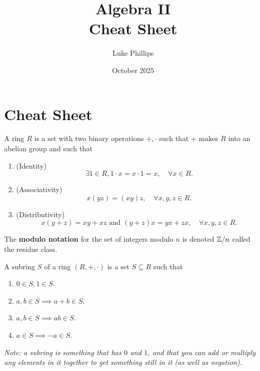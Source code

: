 \documentclass[10pt, a4paper]{article}
\title{Algebra II \\
    \large Cheat Sheet}
\author{Luke Phillips}
\date{October 2025}
\begin{document}
\maketitle

\newpage

\section{Cheat Sheet}

\begin{definition}
    A ring $R$ is a set with two binary operations $+, \cdot$ such that $+$ makes $R$ into an abelian group and such that
    \begin{enumerate}[label = (\roman*)]
        \item (Identity)
        \[
        \exists 1 \in R, 1 \cdot x = x \cdot 1 = x,\quad\forall x \in R.
        \]

        \item (Associativity)
        \[
        x(yz) = (xy)z,\quad\forall x, y, z \in R.
        \]

        \item (Distributivity)
        \[
        x(y + z) = xy + xz\text{ and } (y + z)x = yx + zx,\quad\forall x, y, z \in R.
        \]
    \end{enumerate}
\end{definition}

The \textbf{modulo notation} for the set of integers modulo $n$ is denoted $\mathbb{Z} / n$ called the residue class.

\begin{definition}
    A subring $S$ of a ring $(R, +, \cdot)$ is a set $S \subseteq R$ such that
    \begin{enumerate}[label = (\roman*)]
        \item $0 \in S, 1 \in S$.

        \item $a, b \in S \implies a + b \in S$.

        \item $a, b \in S \implies ab \in S$.

        \item $a \in S \implies -a \in S$.
    \end{enumerate}
\end{definition}
\textit{Note:
a subring is something that has $0$ and $1$,
and that you can add or multiply any elements in it together to get something still in it
(as well as negation).}
\end{document}
